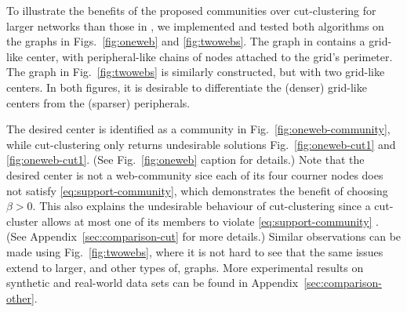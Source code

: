 

To illustrate the benefits of the proposed communities over cut-clustering for larger networks than
those in , we implemented and tested both algorithms on the graphs in
Figs.~\ref{fig:oneweb} and \ref{fig:twowebs}. The graph in  contains a grid-like center,
with peripheral-like chains of nodes attached to the grid's perimeter.
The graph in Fig.~\ref{fig:twowebs} is similarly constructed, but with two grid-like centers.
In both figures, it is desirable to differentiate the (denser) grid-like centers from the (sparser)
peripherals.

The desired center is identified as a community in Fig.~\ref{fig:oneweb-community}, while
cut-clustering only returns undesirable solutions Fig.~\ref{fig:oneweb-cut1} and
\ref{fig:oneweb-cut1}. (See Fig.~\ref{fig:oneweb} caption for details.) 
Note that the desired center is not a web-community sice each of its four courner nodes does not
satisfy \eqref{eq:support-community}, which demonstrates the benefit of choosing $\beta > 0$.
This also explains the undesirable behaviour of cut-clustering since a cut-cluster allows at most
one of its members to violate \eqref{eq:support-community} \cite[Lemma~3.1]{flake:cut-clustering}.
(See Appendix~\ref{sec:comparison-cut} for more details.) Similar observations can be made using
Fig.~\ref{fig:twowebs}, where it is not hard to see that the same issues extend to larger, and other
types of, graphs.
More experimental results on synthetic and real-world data sets can be found in
Appendix~\ref{sec:comparison-other}.



